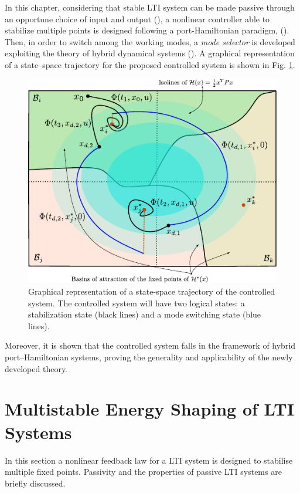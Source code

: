 %
In this chapter, considering that stable LTI system can be made passive through an opportune choice of input and output (\cite{byrnes91}), a nonlinear controller able to stabilize multiple points is designed following a port-Hamiltonian paradigm, (\cite{876703,secchi2007control,ortega2008control,van2014port}). Then, in order to switch among the working modes, a \textit{mode selector} is developed exploiting the theory of hybrid dynamical systems (\cite{van2000introduction,goebel2008}). A graphical representation of a state--space trajectory for the proposed controlled system is shown in Fig. \ref{fig:mesh_graph}.
%
\begin{figure}[!ht]
    \centering
    \includegraphics{Drawings/draw.pdf}
    \caption[Graphical representation of a state-space trajectory of the controlled system]{Graphical representation of a state-space trajectory of the controlled system. The controlled system will have two logical states: a stabilization state (black lines) and a mode switching state (blue lines).}
    \label{fig:mesh_graph}
\end{figure}
%
\newline

%
Moreover, it is shown that the controlled system falls in the framework of hybrid port--Hamiltonian systems, proving the generality and applicability of the newly developed theory.
%

\clearpage

\section{Multistable Energy Shaping of LTI Systems}\label{sec:multistable}
%
In this section a nonlinear feedback law for a LTI system is designed to stabilise multiple fixed points. Passivity and the properties of passive LTI systems are briefly discussed.

